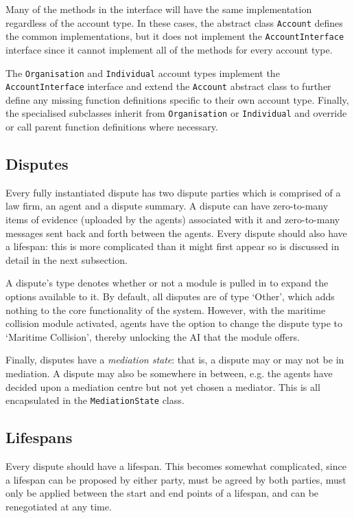 Many of the methods in the interface will have the same implementation regardless of the account type. In these cases, the abstract class \lstinline{Account} defines the common implementations, but it does not implement the \lstinline{AccountInterface} interface since it cannot implement all of the methods for every account type.

The \lstinline{Organisation} and \lstinline{Individual} account types implement the \lstinline{AccountInterface} interface and extend the \lstinline{Account} abstract class to further define any missing function definitions specific to their own account type. Finally, the specialised subclasses inherit from \lstinline{Organisation} or \lstinline{Individual} and override or call parent function definitions where necessary.

\subsection{Disputes}

Every fully instantiated dispute has two dispute parties which is comprised of a law firm, an agent and a dispute summary. A dispute can have zero-to-many items of evidence (uploaded by the agents) associated with it and zero-to-many messages sent back and forth between the agents. Every dispute should also have a lifespan: this is more complicated than it might first appear so is discussed in detail in the next subsection.

A dispute's type denotes whether or not a module is pulled in to expand the options available to it. By default, all disputes are of type `Other', which adds nothing to the core functionality of the system. However, with the maritime collision module activated, agents have the option to change the dispute type to `Maritime Collision', thereby unlocking the AI that the module offers.

Finally, disputes have a \emph{mediation state}: that is, a dispute may or may not be in mediation. A dispute may also be somewhere in between, e.g. the agents have decided upon a mediation centre but not yet chosen a mediator. This is all encapsulated in the \lstinline{MediationState} class.

\subsection{Lifespans}

Every dispute should have a lifespan. This becomes somewhat complicated, since a lifespan can be proposed by either party, must be agreed by both parties, must only be applied between the start and end points of a lifespan, and can be renegotiated at any time.

